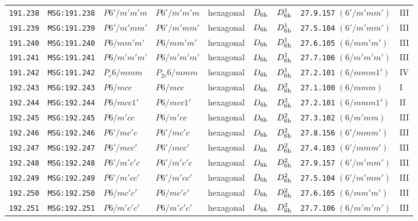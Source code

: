 \documentclass[fleqn,10pt]{jsarticle}
\begin{document}
\begin{center}
\begin{longtable}{lllllllll}
\texttt{191.238} & \texttt{MSG:191.238} & $P6'/m'm'm$ & $P6'/m'm'm$ & hexagonal & $D_{\rm 6h}$ & $D_{\rm 6h}^{1}$ & \texttt{27.9.157} $(6'/m'mm')$ & III \\
\texttt{191.239} & \texttt{MSG:191.239} & $P6'/m'mm'$ & $P6'/m'mm'$ & hexagonal & $D_{\rm 6h}$ & $D_{\rm 6h}^{1}$ & \texttt{27.5.104} $(6'/m'mm')$ & III \\
\texttt{191.240} & \texttt{MSG:191.240} & $P6/mm'm'$ & $P6/mm'm'$ & hexagonal & $D_{\rm 6h}$ & $D_{\rm 6h}^{1}$ & \texttt{27.6.105} $(6/mm'm')$ & III \\
\texttt{191.241} & \texttt{MSG:191.241} & $P6/m'm'm'$ & $P6/m'm'm'$ & hexagonal & $D_{\rm 6h}$ & $D_{\rm 6h}^{1}$ & \texttt{27.7.106} $(6/m'm'm')$ & III \\
\texttt{191.242} & \texttt{MSG:191.242} & $P_{c}6/mmm$ & $P_{2c}6/mmm$ & hexagonal & $D_{\rm 6h}$ & $D_{\rm 6h}^{1}$ & \texttt{27.2.101} $(6/mmm1')$ & IV \\ \hline
\texttt{192.243} & \texttt{MSG:192.243} & $P6/mcc$ & $P6/mcc$ & hexagonal & $D_{\rm 6h}$ & $D_{\rm 6h}^{2}$ & \texttt{27.1.100} $(6/mmm)$ & I \\
\texttt{192.244} & \texttt{MSG:192.244} & $P6/mcc1'$ & $P6/mcc1'$ & hexagonal & $D_{\rm 6h}$ & $D_{\rm 6h}^{2}$ & \texttt{27.2.101} $(6/mmm1')$ & II \\
\texttt{192.245} & \texttt{MSG:192.245} & $P6/m'cc$ & $P6/m'cc$ & hexagonal & $D_{\rm 6h}$ & $D_{\rm 6h}^{2}$ & \texttt{27.3.102} $(6/m'mm)$ & III \\
\texttt{192.246} & \texttt{MSG:192.246} & $P6'/mc'c$ & $P6'/mc'c$ & hexagonal & $D_{\rm 6h}$ & $D_{\rm 6h}^{2}$ & \texttt{27.8.156} $(6'/mmm')$ & III \\
\texttt{192.247} & \texttt{MSG:192.247} & $P6'/mcc'$ & $P6'/mcc'$ & hexagonal & $D_{\rm 6h}$ & $D_{\rm 6h}^{2}$ & \texttt{27.4.103} $(6'/mmm')$ & III \\
\texttt{192.248} & \texttt{MSG:192.248} & $P6'/m'c'c$ & $P6'/m'c'c$ & hexagonal & $D_{\rm 6h}$ & $D_{\rm 6h}^{2}$ & \texttt{27.9.157} $(6'/m'mm')$ & III \\
\texttt{192.249} & \texttt{MSG:192.249} & $P6'/m'cc'$ & $P6'/m'cc'$ & hexagonal & $D_{\rm 6h}$ & $D_{\rm 6h}^{2}$ & \texttt{27.5.104} $(6'/m'mm')$ & III \\
\texttt{192.250} & \texttt{MSG:192.250} & $P6/mc'c'$ & $P6/mc'c'$ & hexagonal & $D_{\rm 6h}$ & $D_{\rm 6h}^{2}$ & \texttt{27.6.105} $(6/mm'm')$ & III \\
\texttt{192.251} & \texttt{MSG:192.251} & $P6/m'c'c'$ & $P6/m'c'c'$ & hexagonal & $D_{\rm 6h}$ & $D_{\rm 6h}^{2}$ & \texttt{27.7.106} $(6/m'm'm')$ & III \\

\end{longtable}
\end{center}
\end{document}
